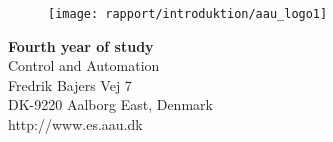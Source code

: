 {}
\thispagestyle{empty}

\begin{minipage}[t]{0.48\textwidth}
\vspace*{-25pt}			%

\begin{figure}[H] 
\texttt{[image: rapport/introduktion/aau\_logo1]}
\end{figure} 
\end{minipage}
\hfill
\begin{minipage}[t]{0.48\textwidth}
{\small 
\textbf{Fourth year of study}  \\
Control and Automation \\
Fredrik Bajers Vej 7 \\
DK-9220 Aalborg East, Denmark\\
http://www.es.aau.dk}
\end{minipage}


\vspace*{1cm}

